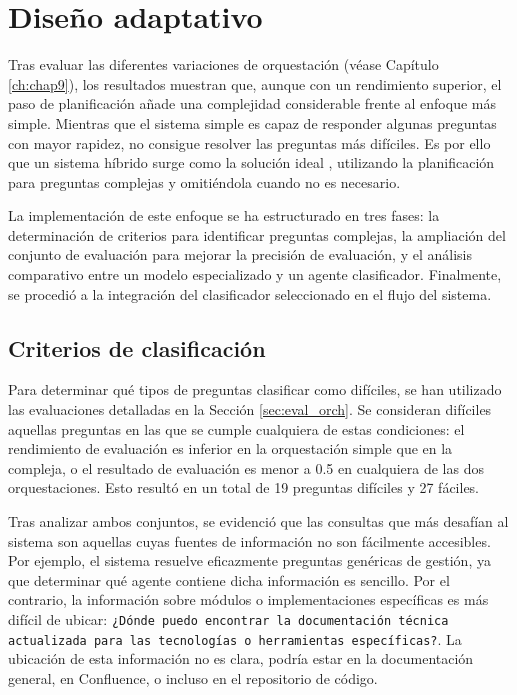 \section{Diseño adaptativo}
\label{sec:adaptativo}
Tras evaluar las diferentes variaciones de orquestación (véase Capítulo \ref{ch:chap9}), los resultados muestran que, aunque con un rendimiento superior, el paso de planificación añade una complejidad considerable frente al enfoque más simple. Mientras que el sistema simple es capaz de responder algunas preguntas con mayor rapidez, no consigue resolver las preguntas más difíciles. Es por ello que un sistema híbrido surge como la solución ideal \cite{jeong_adaptive-rag_2024}, utilizando la planificación para preguntas complejas y omitiéndola cuando no es necesario.

La implementación de este enfoque se ha estructurado en tres fases: la determinación de criterios para identificar preguntas complejas, la ampliación del conjunto de evaluación para mejorar la precisión de evaluación, y el análisis comparativo entre un modelo especializado y un agente clasificador. Finalmente, se procedió a la integración del clasificador seleccionado en el flujo del sistema.

\subsection{Criterios de clasificación}

Para determinar qué tipos de preguntas clasificar como difíciles, se han utilizado las evaluaciones detalladas en la Sección \ref{sec:eval_orch}. Se consideran difíciles aquellas preguntas en las que se cumple cualquiera de estas condiciones: el rendimiento de evaluación es inferior en la orquestación simple que en la compleja, o el resultado de evaluación es menor a 0.5 en cualquiera de las dos orquestaciones. Esto resultó en un total de 19 preguntas difíciles y 27 fáciles.

Tras analizar ambos conjuntos, se evidenció que las consultas que más desafían al sistema son aquellas cuyas fuentes de información no son fácilmente accesibles. Por ejemplo, el sistema resuelve eficazmente preguntas genéricas de gestión, ya que determinar qué agente contiene dicha información es sencillo. Por el contrario, la información sobre módulos o implementaciones específicas es más difícil de ubicar: \texttt{¿Dónde puedo encontrar la documentación técnica actualizada para las tecnologías o herramientas específicas?}. La ubicación de esta información no es clara, podría estar en la documentación general, en Confluence, o incluso en el repositorio de código.

